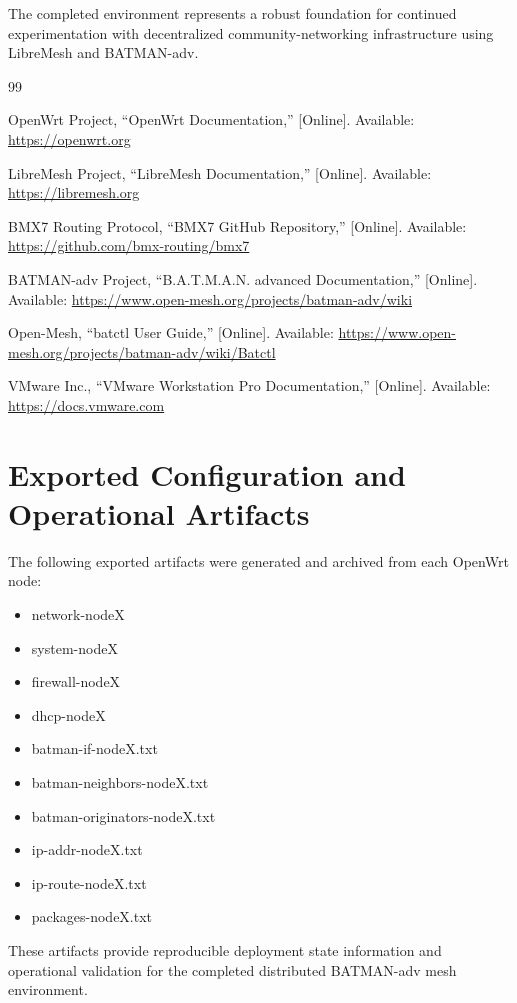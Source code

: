 \documentclass[conference]{IEEEtran}
\begin{document}
The completed environment represents a robust foundation for continued experimentation with decentralized community-networking infrastructure using LibreMesh and BATMAN-adv.



\begin{thebibliography}{99}

OpenWrt Project, ``OpenWrt Documentation,'' [Online]. Available: \url{https://openwrt.org}

LibreMesh Project, ``LibreMesh Documentation,'' [Online]. Available: \url{https://libremesh.org}

BMX7 Routing Protocol, ``BMX7 GitHub Repository,'' [Online]. Available: \url{https://github.com/bmx-routing/bmx7}

BATMAN-adv Project, ``B.A.T.M.A.N. advanced Documentation,'' [Online]. Available: \url{https://www.open-mesh.org/projects/batman-adv/wiki}

Open-Mesh, ``batctl User Guide,'' [Online]. Available: \url{https://www.open-mesh.org/projects/batman-adv/wiki/Batctl}

VMware Inc., ``VMware Workstation Pro Documentation,'' [Online]. Available: \url{https://docs.vmware.com}

\end{thebibliography}


\appendices

\section{Exported Configuration and Operational Artifacts}

The following exported artifacts were generated and archived from each OpenWrt node:

\begin{itemize}
    \item network-nodeX
    \item system-nodeX
    \item firewall-nodeX
    \item dhcp-nodeX
    \item batman-if-nodeX.txt
    \item batman-neighbors-nodeX.txt
    \item batman-originators-nodeX.txt
    \item ip-addr-nodeX.txt
    \item ip-route-nodeX.txt
    \item packages-nodeX.txt
\end{itemize}

These artifacts provide reproducible deployment state information and operational validation for the completed distributed BATMAN-adv mesh environment.
\end{document}
